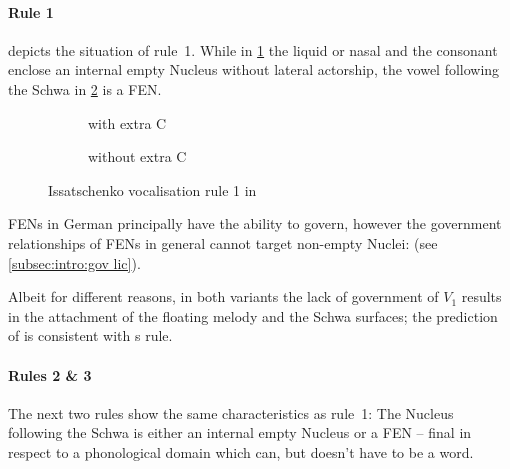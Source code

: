 \paragraph{Rule 1}
depicts the situation of rule~1.
While in \ref{fig:issatschenko voc rule 1:L C end}
the liquid or nasal and the consonant enclose an
internal empty Nucleus without lateral actorship,
the vowel following the Schwa in
\ref{fig:issatschenko voc rule 1:L end}
is a \gls{FEN}.

\begin{figure}[h]
  \centering
  \begin{subfigure}{.49\textwidth}
    \centering
    \begin{structure}{}
      \V[floating]{\textschwa}
      \emptyV[gov]
      \fen
    \end{structure}
    \caption{with extra C}
    \label{fig:issatschenko voc rule 1:L C end}
  \end{subfigure}
  \hfill
  \begin{subfigure}{.49\textwidth}
    \centering
    \begin{structure}{}
      \V[floating]{\textschwa}
      \fen
    \end{structure}
    \caption{without extra C}
    \label{fig:issatschenko voc rule 1:L end}
  \end{subfigure}
  \caption{Issatschenko vocalisation rule 1 in \CVCV}
  \label{fig:issatschenko voc rule 1}
\end{figure}

\Glspl{FEN} in German principally have the ability
to govern, however the government relationships of
\glspl{FEN} in general cannot target
non-empty Nuclei:
 (see \cref{subsec:intro:gov lic}).

Albeit for different reasons, in both variants
the lack of government of $V_1$ results in the
attachment of the floating melody and the Schwa
surfaces; the prediction of \CVCV is consistent with
\citeauthor{issatschenko1974}s rule.

\paragraph{Rules 2 \& 3}
The next two rules show the same characteristics
as rule~1: The Nucleus following the Schwa is either
an internal empty Nucleus or a \gls{FEN}
-- final in respect to a phonological domain
which can, but doesn't have to be a word.

